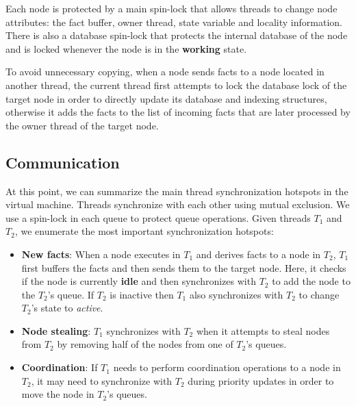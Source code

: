 Each node is protected by a main spin-lock that allows threads to change node
attributes: the fact buffer, owner thread, state variable and locality
information. There is also a database spin-lock that protects the internal
database of the node and is locked whenever the node is in the \textbf{working}
state.  

To avoid unnecessary copying, when a node sends facts to a node located in
another thread, the current thread first attempts to lock the database lock of
the target node in order to directly update its database and indexing
structures, otherwise it adds the facts to the list of incoming facts that are
later processed by the owner thread of the target node.


\subsection{Communication}

At this point, we can summarize the main thread synchronization hotspots in the
virtual machine. Threads synchronize with each other using mutual exclusion. We
use a spin-lock in each queue to protect queue operations.  Given threads $T_1$
and $T_2$, we enumerate the most important synchronization hotspots:

\begin{itemize}

   \item \textbf{New facts}: When a node executes in $T_1$ and derives facts to
   a node in $T_2$, $T_1$ first buffers the facts and then sends them to the
   target node. Here, it checks if the node is currently \textbf{idle} and then
   synchronizes with $T_2$ to add the node to the $T_2$'s queue.  If $T_2$ is
   inactive  then $T_1$ also synchronizes with $T_2$ to change $T_2$'s state to
   \emph{active}.

   \item \textbf{Node stealing}: $T_1$ synchronizes with $T_2$ when it attempts
   to steal nodes from $T_2$ by removing half of the nodes from one of $T_2$'s
   queues.

   \item \textbf{Coordination}: If $T_1$ needs to perform coordination
   operations to a node in $T_2$, it may need to synchronize with $T_2$ during
   priority updates in order to move the node in $T_2$'s queues.

\end{itemize}



